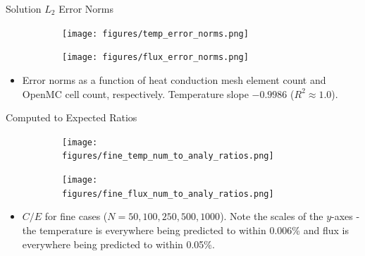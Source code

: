 \documentclass[9pt,t,aspectratio=169]{beamer}
\begin{document}
\begin{frame}{Solution $L_{2}$ Error Norms}
    \pause
    \vspace*{-0.45cm}
    \begin{figure}[T]
        \hspace*{-0.9cm}
        \begin{subfigure}{0.4995\linewidth}
            \texttt{[image: figures/temp\_error\_norms.png]}
        \end{subfigure}\hspace*{0.75cm}
        \begin{subfigure}{0.4995\linewidth}
            \texttt{[image: figures/flux\_error\_norms.png]}
        \end{subfigure}
    \end{figure}
    \vspace*{-0.15cm}
    \begin{itemize}
        \item Error norms as a function of heat conduction mesh element count and OpenMC cell count, respectively. Temperature slope $-0.9986$ ($R^2\approx1.0$).
    \end{itemize}
\end{frame}

\begin{frame}{Computed to Expected Ratios}
    \vspace*{-0.5cm}
    \pause
    \begin{figure}[T]
        \hspace*{-0.7cm}
        \begin{subfigure}{0.495\linewidth}
            \texttt{[image: figures/fine\_temp\_num\_to\_analy\_ratios.png]}
        \end{subfigure}\hspace*{0.85cm}
        \begin{subfigure}{0.495\linewidth}
            \texttt{[image: figures/fine\_flux\_num\_to\_analy\_ratios.png]}
        \end{subfigure}
    \end{figure}
    \vspace*{-0.25cm}
    \begin{itemize}
        \item $C/E$ for fine cases ($N=50,100,250,500,1000$). Note the scales of the $y$-axes - the temperature is everywhere being predicted to within 0.006\% and flux is everywhere being predicted to within 0.05\%.
    \end{itemize}
\end{frame}
\end{document}
